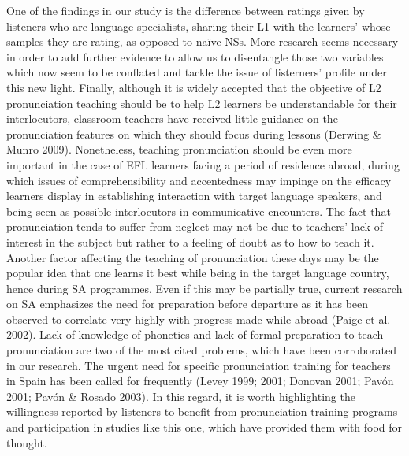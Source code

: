 \documentclass[12pt]{article}
\newenvironment{styleStandard}{\setlength\leftskip{0cm}\setlength\rightskip{0cm plus 1fil}\setlength\parindent{0cm}\setlength\parfillskip{0pt plus 1fil}\setlength\parskip{0in plus 1pt}\writerlistparindent\writerlistleftskip\leavevmode\normalfont\normalsize\writerlistlabel\ignorespaces}{\unskip\vspace{0.111in plus 0.0111in}\par}
\newcommand\writerlistleftskip{}
\newcommand\writerlistparindent{}
\newcommand\writerlistlabel{}
\begin{document}
\begin{styleStandard}
One of the findings in our study is the difference between ratings given by listeners who are language specialists, sharing their L1 with the learners’ whose samples they are rating, as opposed to naïve NSs. More research seems necessary in order to add further evidence to allow us to disentangle those two variables which now seem to be conflated and tackle the issue of listerners’ profile under this new light. Finally, although it is widely accepted that the objective of L2 pronunciation teaching should be to help L2 learners be understandable for their interlocutors, classroom teachers have received little guidance on the pronunciation features on which they should focus during lessons (Derwing \& Munro 2009). Nonetheless, teaching pronunciation should be even more important in the case of EFL learners facing a period of residence abroad, during which issues of comprehensibility and accentedness may impinge on the efficacy learners display in establishing interaction with target language speakers, and being seen as possible interlocutors in communicative encounters. The fact that pronunciation tends to suffer from neglect may not be due to teachers’ lack of interest in the subject but rather to a feeling of doubt as to how to teach it. Another factor affecting the teaching of pronunciation these days may be the popular idea that one learns it best while being in the target language country, hence during SA programmes. Even if this may be partially true, current research on SA emphasizes the need for preparation before departure as it has been observed to correlate very highly with progress made while abroad (Paige et al. 2002). Lack of knowledge of phonetics and lack of formal preparation to teach pronunciation are two of the most cited problems, which have been corroborated in our research. The urgent need for specific pronunciation training for teachers in Spain has been called for frequently (Levey 1999; 2001; Donovan 2001; Pavón 2001; Pavón \& Rosado 2003). In this regard, it is worth highlighting the willingness reported by listeners to benefit from pronunciation training programs and participation in studies like this one, which have provided them with food for thought. 
\end{styleStandard}
\end{document}
